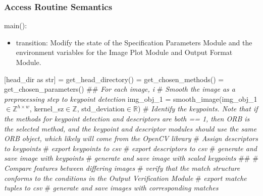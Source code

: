 \documentclass[12pt, titlepage]{article}
\begin{document}
\subsubsection{Access Routine Semantics}
\noindent main():
\begin{itemize}
\item transition: Modify the state of the Specification Parameters Module and the 
environment variables for the Image Plot Module and Output Format Module.
\end{itemize}
[head\_dir as str] = get\_head\_directory() \newline {} 
= get\_chosen\_methods() \newline {} = get\_chosen\_parameters() \newline \newline
\#\# \textit{For each image, i}\newline
\# \textit{Smooth the image as a preprocessing step to keypoint detection} \newline
img\_obj\_1 = smooth\_image(img\_obj\_1$ \in \mathbb{Z}^{h \times w}$, kernel\_sz$ \in \mathbb{Z}$, 
std\_deviation$ \in \mathbb{R}$) \newline \newline
\# \textit{Identify the keypoints. Note that if the methods for keypoint detection and 
descriptors are both == 1, then ORB is the selected method, and the keypoint and descriptor 
modules should use the same ORB object, which likely will come from the OpenCV library}\newline
\newline 
\# \textit{Assign descriptors to keypoints} \newline \newline
\# \textit{export keypoints to csv} \newline 
\# \textit{export descriptors to csv} \newline\newline
\# \textit{generate and save image with keypoints} \newline 
\# \textit{generate and save image with scaled keypoints} \newline
\#\# \newline \newline
\# \textit{Compare features between differing images} \newline \newline
\# \textit{verify that the match structure conforms to the conditions in the
Output Verification Module} \newline \newline 
\# \textit{export matche tuples to csv} \newline 
\# \textit{generate and save images with corresponding matches} \newline
\end{document}
